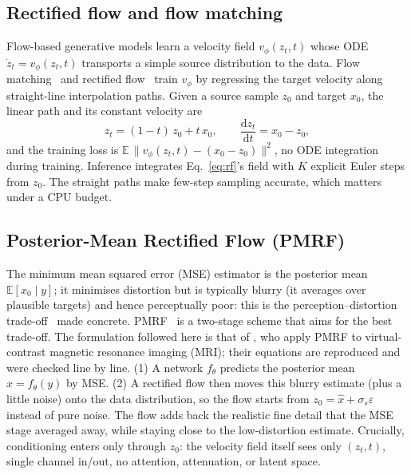 \documentclass[11pt,a4paper]{article}
\begin{document}
\subsection{Rectified flow and flow matching}
\label{sec:rf}
Flow-based generative models learn a velocity field $v_\phi(z_t,t)$ whose ODE
$\dot z_t = v_\phi(z_t,t)$ transports a simple source distribution to the data.
Flow matching~\parencite{lipman2023flow} and rectified flow~\parencite{liu2023rectifiedflow}
train $v_\phi$ by regressing the target velocity along straight-line interpolation
paths. Given a source sample $z_0$ and target $x_0$, the linear path and its constant
velocity are
\begin{equation}
z_t = (1-t)\,z_0 + t\,x_0, \qquad \frac{\mathrm{d}z_t}{\mathrm{d}t} = x_0 - z_0,
\label{eq:rf}
\end{equation}
and the training loss is $\mathbb{E}\,\lVert v_\phi(z_t,t) - (x_0-z_0)\rVert^2$, no
ODE integration during training. Inference integrates Eq.~\ref{eq:rf}'s field with
$K$ explicit Euler steps from $z_0$. The straight paths make few-step sampling
accurate, which matters under a CPU budget.

\subsection{Posterior-Mean Rectified Flow (PMRF)}
\label{sec:pmrf-theory}
The minimum mean squared error (MSE) estimator is the posterior mean $\mathbb{E}[x_0\mid y]$; it
minimises distortion but is typically blurry (it averages over plausible targets) and
hence perceptually poor: this is the perception--distortion
trade-off~\parencite{blau2018perception} made concrete. PMRF~\parencite{ohayon2025pmrf}
is a two-stage scheme that aims for the best trade-off. The formulation followed here is
that of \textcite{brandstotter2025pmrf}, who apply PMRF to virtual-contrast magnetic resonance imaging (MRI); their equations
are reproduced and were checked line by line. (1) A network
$f_\theta$ predicts the posterior mean $\hat x = f_\theta(y)$ by MSE. (2) A rectified
flow then moves this blurry estimate (plus a little noise) onto the data
distribution, so the flow starts from $z_0 = \hat x + \sigma_s\varepsilon$ instead of
pure noise. The flow adds back the realistic fine detail that the MSE
stage averaged away, while staying close to the low-distortion estimate. Crucially,
conditioning enters only through $z_0$: the velocity field itself sees only
$(z_t,t)$, single channel in/out, no attention, attenuation, or latent space.
\end{document}
